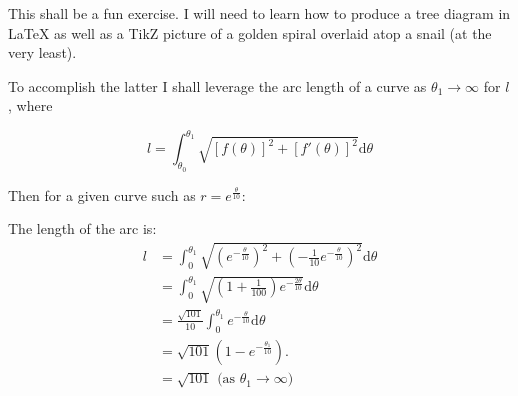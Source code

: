\documentclass{article}
\begin{document}
This shall be a fun exercise. I will need to learn how to produce a tree diagram in \LaTeX{} as well as a TikZ picture of a golden spiral overlaid atop a snail (at the very least).

To accomplish the latter I shall leverage the arc length of a curve as \(\theta_1 \rightarrow \infty\) for \(l\), where

\[ l = \int^{\theta_1}_{\theta_0} \sqrt{[f(\theta)]^2 + [f'(\theta)]^2} \mathrm{d}\theta\]

Then for a given curve such as \(r = e^\frac{\theta}{10}\):
\begin{center} %
\end{center}

The length of the arc is:
\begin{align*}
    l &= \int^{\theta_1}_{0} \sqrt{(e^{-\frac{\theta}{10}})^2 + (-\frac{1}{10}e^{-\frac{\theta}{10}})^2}\mathrm{d}\theta\\
    &= \int^{\theta_1}_{0} \sqrt{(1+\frac{1}{100})e^{-\frac{2\theta}{10}}} \mathrm{d}\theta\\
    &= \frac{\sqrt{101}}{10} \int^{\theta_1}_0 e^{-\frac{\theta}{10}}\mathrm{d}\theta\\
    &= \sqrt{101}(1 - e^{-\frac{\theta_1}{10}}).\\
    &= \sqrt{101} \text{ (as \(\theta_1 \rightarrow \infty\))}
\end{align*}
\end{document}
